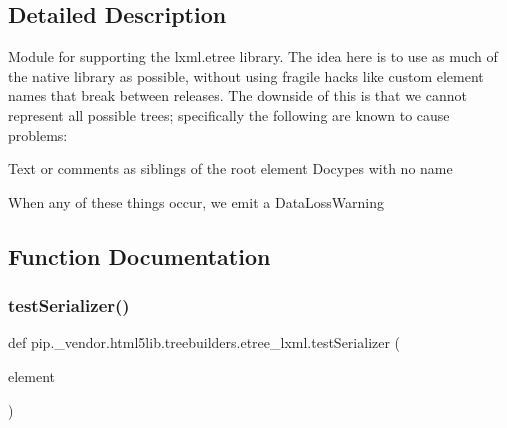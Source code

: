 \subsection{Detailed Description}
\begin{DoxyVerb}Module for supporting the lxml.etree library. The idea here is to use as much
of the native library as possible, without using fragile hacks like custom element
names that break between releases. The downside of this is that we cannot represent
all possible trees; specifically the following are known to cause problems:

Text or comments as siblings of the root element
Docypes with no name

When any of these things occur, we emit a DataLossWarning
\end{DoxyVerb}
 

\subsection{Function Documentation}
\mbox{\label{namespacepip_1_1__vendor_1_1html5lib_1_1treebuilders_1_1etree__lxml_aa7b80f9257214665ee9b57995e458cb2}} 
\subsubsection{\texorpdfstring{test\+Serializer()}{testSerializer()}}
{\footnotesize\ttfamily def pip.\+\_\+vendor.\+html5lib.\+treebuilders.\+etree\+\_\+lxml.\+test\+Serializer (\begin{DoxyParamCaption}\item[{}]{element }\end{DoxyParamCaption})}

\mbox{\label{namespacepip_1_1__vendor_1_1html5lib_1_1treebuilders_1_1etree__lxml_af108ba67eca36b49a3d75e78d0d35be8}} 

